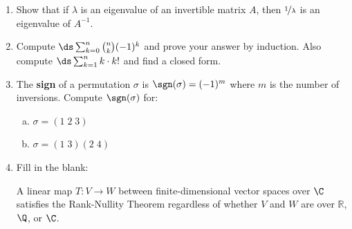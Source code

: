 \documentclass[11pt]{article}
\newcommand{\R}{\mathbb{R}}
\begin{document}
\begin{enumerate}
\item Show that if $\lambda$ is an eigenvalue of an invertible matrix $A$, then $\nicefrac{1}{\lambda}$ is an eigenvalue of $A^{-1}$.

\item Compute $\ds \sum_{k=0}^{n} \binom{n}{k} (-1)^k$ and prove your answer by induction. Also compute $\ds \sum_{k=1}^{n} k \cdot k!$ and find a closed form.

\item The \textbf{sign} of a permutation $\sigma$ is $\sgn(\sigma) = (-1)^{m}$ where $m$ is the number of inversions. Compute $\sgn(\sigma)$ for:
\begin{enumerate}[(a)]
  \item $\sigma = (1 \; 2 \; 3)$
  \item $\sigma = (1 \; 3)(2 \; 4)$
\end{enumerate}

\item Fill in the blank: \blankbox{2in}{0.5in}

A linear map $T \colon V \to W$ between finite-dimensional vector spaces over $\C$ satisfies the Rank-Nullity Theorem regardless of whether $V$ and $W$ are over $\R$, $\Q$, or $\C$.

\end{enumerate}
\end{document}
